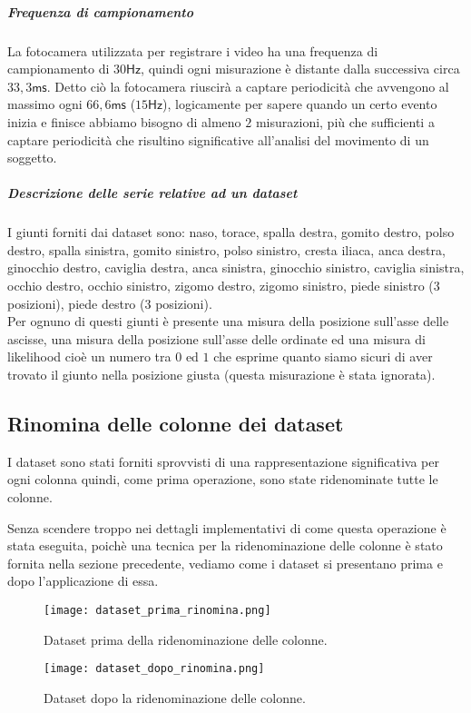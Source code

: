 \subparagraph*{Frequenza di campionamento}
La fotocamera utilizzata per registrare i video ha una frequenza di campionamento di 
$30\mathsf{Hz}$, quindi ogni misurazione è distante dalla successiva circa $33,3\mathsf{ms}$.
Detto ciò la fotocamera riuscirà a captare periodicità che avvengono al massimo ogni $66,6\mathsf{ms}$
($15\mathsf{Hz}$), logicamente per sapere quando un certo evento inizia e finisce abbiamo
bisogno di almeno $2$ misurazioni, più che sufficienti a captare periodicità che risultino
significative all'analisi del movimento di un soggetto.

\subparagraph*{Descrizione delle serie relative ad un dataset}
I giunti forniti dai dataset sono: naso, torace, spalla destra, gomito destro, polso destro, 
spalla sinistra, gomito sinistro, polso sinistro, cresta iliaca, anca destra, ginocchio destro, 
caviglia destra, anca sinistra, ginocchio sinistro, caviglia sinistra, occhio destro, 
occhio sinistro, zigomo destro, zigomo sinistro, piede sinistro ($3$ posizioni), 
piede destro ($3$ posizioni).\\
Per ognuno di questi giunti è presente una misura della posizione sull'asse delle ascisse, 
una misura della posizione sull'asse delle ordinate ed una misura di likelihood cioè un numero
tra $0$ ed $1$ che esprime quanto siamo sicuri di aver trovato il giunto nella posizione giusta
(questa misurazione è stata ignorata).

\subsection{Rinomina delle colonne dei dataset}
I dataset sono stati forniti sprovvisti di una rappresentazione significativa per ogni colonna
quindi, come prima operazione, sono state ridenominate tutte le colonne.

Senza scendere troppo nei dettagli implementativi di come questa operazione è stata eseguita,
poichè una tecnica per la ridenominazione delle colonne è stato fornita nella sezione precedente,
vediamo come i dataset si presentano prima e dopo l'applicazione di essa.

\begin{figure}[H]
    \centering
    \texttt{[image: dataset\_prima\_rinomina.png]}
    \caption{Dataset prima della ridenominazione delle colonne.}
    \label{fig:ds_prima_rinomina}
\end{figure}

\begin{figure}[H]
    \centering
    \texttt{[image: dataset\_dopo\_rinomina.png]}
    \caption{Dataset dopo la ridenominazione delle colonne.}
    \label{fig:ds_dopo_rinomina}
\end{figure}

